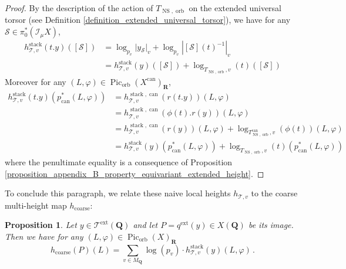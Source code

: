 \documentclass{proc-l}
\newcommand{\R}{\mathbf{R}}
\newcommand{\Q}{\mathbf{Q}}
\DeclareMathOperator{\Pic}{Pic}
\DeclareMathOperator{\can}{can}
\DeclareMathOperator{\stack}{stack}
\DeclareMathOperator{\NS}{NS}
\DeclareMathOperator{\coarse}{coarse}
\DeclareMathOperator{\orb}{orb}
\DeclareMathOperator{\ext}{ext}
\newcommand{\stackS}{\mathcal{S}}
\newcommand{\stackT}{\mathcal{T}}
\newcommand{\sheafI}{\mathcal{I}}
\newcommand{\twistsector}{\pi_0^*(\sheafI_{\mu} X)}
\newtheorem{prop}[theorem]{Proposition}
\theoremstyle{definition}
\theoremstyle{remark}
\numberwithin{equation}{section}
\begin{document}
\begin{proof}
By the description of the action of $T_{\NS,\orb}$ on the extended universal torsor (see Definition \ref{definition_extended_universal_torsor}), we have for any $\stackS \in \twistsector$,
    \begin{align*}
        h_{\stackT,v}^{\stack}(t.y)([\stackS]) &=  \log_{p_v} | y{}_{\stackS} |_v + \log_{p_v} |[\stackS](t)^{-1}|_v \\
        &= h_{\stackT,v}^{\stack}\left(y\right)([\stackS]) + \log_{T_{\NS,\orb},v}(t)([\stackS])
    \end{align*}Moreover for any $(L,\varphi) \in \Pic_{\orb}(X^{\can})_{\R}$,
    \begin{align*}
        h_{\stackT,v}^{\stack}(t.y)(p_{\can}^*(L,\varphi)) &= h_{\stackT,v}^{\stack,\can}(r(t.y))(L,\varphi) \\
        &= h_{\stackT,v}^{\stack,\can}\left(\phi(t).r(y)\right)(L,\varphi)  \\
        &= h_{\stackT,v}^{\stack,\can}\left(r(y)\right)(L,\varphi) + \log_{T_{\NS,\orb}^{\can},v}(\phi(t))(L,\varphi) \\
        &= h_{\stackT,v}^{\stack}\left(y\right)(p_{\can}^*(L,\varphi)) + \log_{T_{\NS,\orb},v}(t)(p_{\can}^*(L,\varphi)) 
    \end{align*}where the penultimate equality is a consequence of Proposition \ref{proposition_appendix_B_property_equivariant_extended_height}.
\end{proof}

To conclude this paragraph, we relate these naive local heights $h_{\stackT,v}$ to the coarse multi-height map $h_{\coarse}$:

\begin{prop}\label{proposition_coarse_height_naive_local_height}
    Let $y \in \stackT^{\ext}(\Q)$ and let $P = q^{\ext}(y) \in X(\Q)$ be its image. Then we have for any $(L,\varphi) \in \Pic_{\orb}(X)_{\R}$
    \[
        h_{\coarse}(P)(L) = \sum\limits_{v \in M_{\Q}} \log(p_v) \cdot h_{\stackT,v}^{\stack}(y)(L,\varphi) \, .
    \]
\end{prop}
\end{document}
